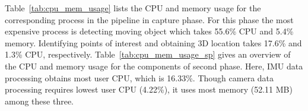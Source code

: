 \begin{table}[!thb]
\centering
\footnotesize
{}
\caption{System lifetime under different settings.}
\label{tab:lifetime_estimation}
\end{table}

Table~\ref{tab:cpu_mem_usage} lists the CPU and memory usage for the corresponding process in the pipeline in capture phase. For this phase the most expensive process is detecting moving object which takes 55.6\% CPU and 5.4\% memory. Identifying points of interest and obtaining 3D location takes 17.6\% and 1.3\% CPU, respectively. Table~\ref{tab:cpu_mem_usage_sp} gives an overview of the CPU and memory usage for the components of second phase. Here, IMU data processing obtains most user CPU, which is 16.33\%. Though camera data processing requires lowest user CPU (4.22\%), it uses most memory (52.11 MB) among these three.

\begin{table}[!thb]
\centering
\footnotesize
{}
\caption{CPU and memory usage of Raspberry Pi}
\label{tab:cpu_mem_usage}
\end{table}
\vspace{-0.5cm}

